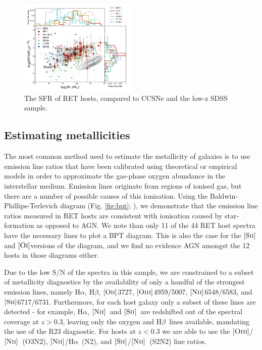 \documentclass[fleqn,usenatbib,]{mnras}
\newcommand{\replylluis}[1]{\color{green}#1 \color{black}}
\newcommand{\halpha}[0]{H$\alpha$}
\newcommand{\hbeta}[0]{H$\beta$}
\newcommand{\OII}[0]{$[\textnormal{\textsc{Oii}}]$}
\newcommand{\OI}[0]{$[\textnormal{\textsc{Oi}}]$}
\newcommand{\OIII}[0]{$[\textnormal{\textsc{Oiii}}]$}
\newcommand{\SII}[0]{$[\textnormal{\textsc{Sii}}]$}
\newcommand{\NII}[0]{$[\textnormal{\textsc{Nii}}]$}
\begin{document}
\begin{figure}
\includegraphics[width=0.5\textwidth]{figs/SFR_Mike.png}
\caption{The SFR of RET hosts, compared to CCSNe and the low-z SDSS sample.
\label{fig:sfms_sfr}}
\end{figure}


\subsection{Estimating metallicities \label{subsec:calc_Z}}

The most common method used to estimate the metallicity of galaxies is to use emission line ratios that have been calibrated using theoretical or empirical models in order to approximate the gas-phase oxygen abundance in the interstellar medium. Emission lines originate from regions of ionised gas, but there are a number of possible causes of this ionisation. Using the Baldwin-Phillips-Terlevich diagram (Fig. \ref{fig:bpt}; \citealt{Baldwin1981}), we demonstrate that the emission line ratios measured in RET hosts are consistent with ionisation caused by star-formation as opposed to AGN. \replylluis{We note than only 11 of the 44 RET host spectra have the necessary lines to plot a BPT diagram. This is also the case for the \SII and \OI versions of the diagram, and we find no evidence AGN amongst the 12 hosts in those diagrams either.}

Due to the low S/N of the spectra in this sample, we are constrained to a subset of metallicity diagnostics by the availability of only a handful of the strongest emission lines, namely \halpha, \hbeta, \OII 3727, \OIII 4959/5007, \NII 6548/6583, and \SII 6717/6731. Furthermore, for each host galaxy only a subset of these lines are detected - for example, \halpha, \NII~and \SII~are redshifted out of the spectral coverage at $z>0.3$, leaving only the oxygen and \hbeta~lines available, mandating the use of the R23 diagnostic. For hosts at $z<0.3$ we are able to use the \OIII /\NII~(O3N2), \NII /\halpha~(N2), and \SII /\NII~(S2N2) line ratios. 
\end{document}
